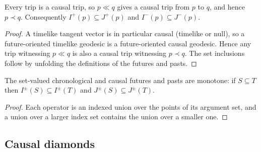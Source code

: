 \medskip

\begin{lemma}
    \label{lmm:chronological-implies-causal}
    \leanok
    Every trip is a causal trip, so $p \ll q$ gives a causal trip from $p$ to $q$, and hence $p \prec q$. Consequently $I^+(p) \subseteq J^+(p)$ and $I^-(p) \subseteq J^-(p)$.
\end{lemma}
\begin{proof}
    \leanok
    A timelike tangent vector is in particular causal (timelike or null), so a future-oriented timelike geodesic is a future-oriented causal geodesic. Hence any trip witnessing $p \ll q$ is also a causal trip witnessing $p \prec q$. The set inclusions follow by unfolding the definitions of the futures and pasts.
\end{proof}

\medskip

\begin{lemma}
    \label{lmm:future-past-monotone}
    \leanok
    The set-valued chronological and causal futures and pasts are monotone: if $S \subseteq T$ then $I^\pm(S) \subseteq I^\pm(T)$ and $J^\pm(S) \subseteq J^\pm(T)$.
\end{lemma}
\begin{proof}
    \leanok
    Each operator is an indexed union over the points of its argument set, and a union over a larger index set contains the union over a smaller one.
\end{proof}

\medskip

\subsection{Causal diamonds}


